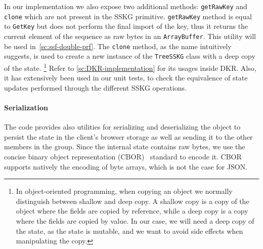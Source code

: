 In our implementation we also expose two additional methods:
\texttt{getRawKey} and \texttt{clone} which are not present 
in the SSKG primitive. 
\texttt{getRawKey} method is equal to \texttt{GetKey}
but does not perform the final import of the key, thus it 
returns the current element of the sequence as raw bytes
in an \texttt{ArrayBuffer}. 
This utility will be used in~\cref{sc:ssf-double-prf}.
The \texttt{clone} method, as the name intuitively suggests, 
is used to create a new instance
of the \texttt{TreeSSKG} class with a deep copy of the state.
\footnote{In object-oriented programming, when copying an object we normally distinguish between shallow and deep copy. 
A shallow copy is a copy of the object where the fields are 
copied by reference, while a deep copy is a copy where the 
fields are copied by value. 
In our case, we will need a deep copy of the state, 
as the state is mutable, and we want to avoid side effects 
when manipulating the copy.} 
Refer to \cref{sc:DKR-implementation} for its usages inside DKR. 
Also, it has extensively been used in our unit tests, to check the equivalence
of state updates performed through the different SSKG operations.

\paragraph{Serialization} The code provides also utilities for serializing and deserializing 
the object to persist the state in the client's browser storage
as well as sending it to the other members in the group.
Since the internal state contains raw bytes, we use the concise binary 
object representation (CBOR)~\cite{rfc8949} standard to encode it. 
CBOR supports natively the encoding of byte arrays, which is not the case
for JSON.

